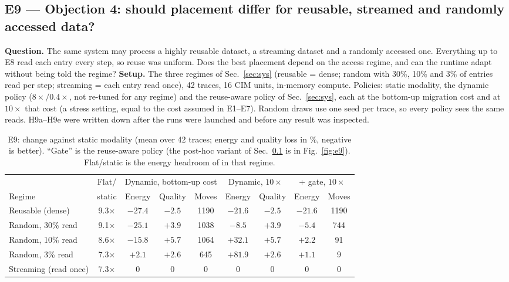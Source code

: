 \subsection{E9 --- Objection 4: should placement differ for reusable, streamed and randomly accessed data?}
\label{sec:e9}
\textbf{Question.} The same system may process a highly reusable dataset, a streaming dataset and a randomly accessed one. Everything up to E8 read each entry every step, so reuse was uniform. Does the best placement depend on the access regime, and can the runtime adapt without being told the regime? \textbf{Setup.} The three regimes of Sec.~\ref{sec:sys} (reusable = dense; random with 30\%, 10\% and 3\% of entries read per step; streaming = each entry read once), 42 traces, 16 CIM units, in-memory compute. Policies: static modality, the dynamic policy ($8\times/0.4\times$, not re-tuned for any regime) and the reuse-aware policy of Sec.~\ref{sec:sys}, each at the bottom-up migration cost and at $10\times$ that cost (a stress setting, equal to the cost assumed in E1--E7). Random draws use one seed per trace, so every policy sees the same reads. H9a--H9e were written down after the runs were launched and before any result was inspected.

\begin{table}[t]
\centering\small
\caption{E9: change against static modality (mean over 42 traces; energy and quality loss in \%, negative is better). ``Gate'' is the reuse-aware policy (the post-hoc variant of Sec.~\ref{sec:e9} is in Fig.~\ref{fig:e9}). Flat/static is the energy headroom of \warm{} in that regime.}
\label{tab:e9}
\setlength{\tabcolsep}{4pt}
\begin{tabular}{lcccccccc}
\toprule
 & Flat/ & \multicolumn{3}{c}{Dynamic, bottom-up cost} & \multicolumn{2}{c}{Dynamic, $10\times$} & \multicolumn{2}{c}{+ gate, $10\times$}\\
\cmidrule(lr){3-5}\cmidrule(lr){6-7}\cmidrule(lr){8-9}
Regime & static & Energy & Quality & Moves & Energy & Quality & Energy & Moves\\
\midrule
Reusable (dense)      & 9.3$\times$ & $-27.4$ & $-2.5$ & 1190 & $-21.6$ & $-2.5$ & $-21.6$ & 1190\\
Random, 30\% read     & 9.1$\times$ & $-25.1$ & $+3.9$ & 1038 & $-8.5$  & $+3.9$ & $-5.4$  & 744\\
Random, 10\% read     & 8.6$\times$ & $-15.8$ & $+5.7$ & 1064 & $+32.1$ & $+5.7$ & $+2.2$  & 91\\
Random, 3\% read      & 7.3$\times$ & $+2.1$  & $+2.6$ & 645  & $+81.9$ & $+2.6$ & $+1.1$  & 9\\
Streaming (read once) & 7.3$\times$ & $0$ & $0$ & 0 & $0$ & $0$ & $0$ & 0\\
\bottomrule
\end{tabular}
\end{table}

